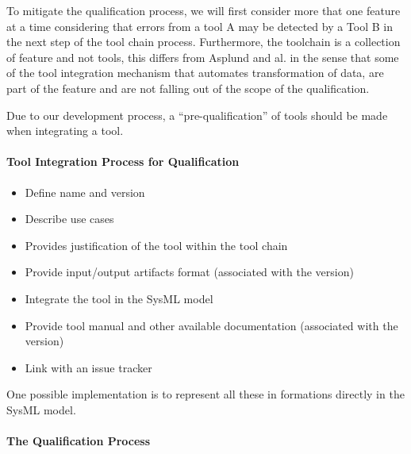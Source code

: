 To mitigate the qualification process, we will first consider more
that one feature at a time considering that errors from a tool A may
be detected by a Tool B in the next step of the tool chain process.
Furthermore, the toolchain is a collection
of feature and not tools, this differs from Asplund and al. in the sense that
some of the tool integration mechanism that automates transformation of data, are part
of the feature and are not falling out of the scope of the qualification.

Due to our development process, a ``pre-qualification'' of tools should be made
when integrating a tool.

\paragraph{Tool Integration Process for Qualification}

\begin{itemize}
\item Define name and version
\item Describe use cases
\item Provides justification of the tool within the tool chain
\item Provide input/output artifacts format (associated with the
  version)
\item Integrate the tool in the SysML model
\item Provide tool manual and other available documentation (associated with the version)
\item Link with an issue tracker
\end{itemize}

One possible implementation is to represent all these in formations
directly in the SysML model.

\paragraph{The Qualification Process}

